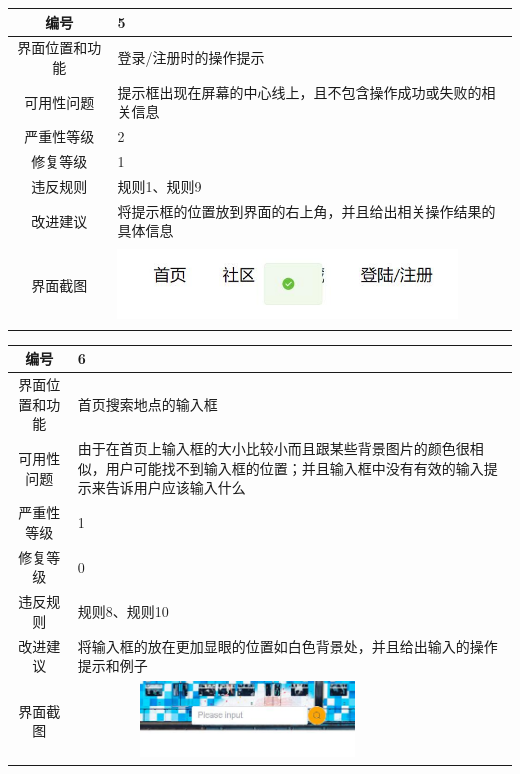 \documentclass[a4paper,12pt]{article}
\begin{document}
\vspace{2em}

\begin{tabular}{|c|p{10cm}|}
	\hline
	编号 & 5 \\
	\hline
	界面位置和功能 & 登录/注册时的操作提示 \\
	\hline
	可用性问题 & 提示框出现在屏幕的中心线上，且不包含操作成功或失败的相关信息 \\
	\hline
	严重性等级 & 2 \\
	\hline
	修复等级 & 1 \\
	\hline
	违反规则 & 规则1、规则9 \\
	\hline
	改进建议 & 将提示框的位置放到界面的右上角，并且给出相关操作结果的具体信息 \\
	\hline
	界面截图 & \includegraphics[width=9cm, height=2cm]{q5.jpg} \\
	\hline
\end{tabular}

\vspace{2em}

\begin{tabular}{|c|p{10cm}|}
	\hline
	编号 & 6 \\
	\hline
	界面位置和功能 & 首页搜索地点的输入框 \\
	\hline
	可用性问题 & 由于在首页上输入框的大小比较小而且跟某些背景图片的颜色很相似，用户可能找不到输入框的位置；并且输入框中没有有效的输入提示来告诉用户应该输入什么 \\
	\hline
	严重性等级 & 1 \\
	\hline
	修复等级 & 0 \\
	\hline
	违反规则 & 规则8、规则10 \\
	\hline
	改进建议 & 将输入框的放在更加显眼的位置如白色背景处，并且给出输入的操作提示和例子 \\
	\hline
	界面截图 & \includegraphics[width=9cm, height=2cm]{q6.jpg} \\
	\hline
\end{tabular}

\vspace{2em}
\end{document}
